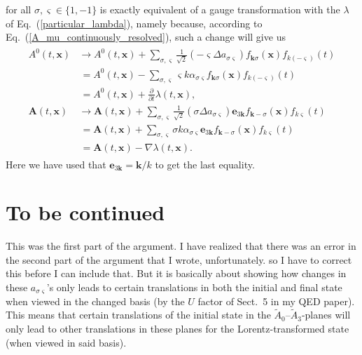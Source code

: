\documentclass{article}
\begin{document}
for all $\sigma, \varsigma \in\{1, -1\}$ is exactly equivalent of a gauge transformation with the $\lambda$ of Eq.\ (\ref{particular_lambda}), 
namely because, according to Eq.\ (\ref{A_mu_continuously_resolved}), such a change will give us
\begin{align}
\begin{aligned}
	A^0(t, \mathbf{x}) &\to
		A^0(t, \mathbf{x}) 
		+ 
		\sum_{\sigma, \varsigma} 
			\frac{1}{\sqrt{2}} (
				-\varsigma \Delta a_{\sigma\varsigma}
			)
			f_{\mathbf{k}\sigma}(\mathbf{x}) f_{k(-\varsigma)}(t)
	\\&\,=
		A^0(t, \mathbf{x}) 
		-
		\sum_{\sigma, \varsigma} 
			\varsigma k \alpha_{\sigma \varsigma}
			f_{\mathbf{k}\sigma}(\mathbf{x}) f_{k(-\varsigma)}(t)
	\\&\,=
		A^0(t, \mathbf{x}) 
		+
		\frac{\partial}{\partial t} \lambda(t, \mathbf{x}),
	\\
	\mathbf{A}(t, \mathbf{x}) &\to
		\mathbf{A}(t, \mathbf{x})
		+ 
		\sum_{\sigma, \varsigma} 
			\frac{1}{\sqrt{2}} (
				\sigma \Delta a_{\sigma\varsigma}
			)
			\mathbf{e}_{3\mathbf{k}}
			f_{\mathbf{k}-\sigma}(\mathbf{x}) f_{k\varsigma}(t)
	\\&\,=
		\mathbf{A}(t, \mathbf{x})
		+
		\sum_{\sigma, \varsigma} 
			\sigma k \alpha_{\sigma \varsigma}
			\mathbf{e}_{3\mathbf{k}}
			f_{\mathbf{k}-\sigma}(\mathbf{x}) f_{k\varsigma}(t)
	\\&\,=
		\mathbf{A}(t, \mathbf{x})
		- 
		\nabla \lambda(t, \mathbf{x}).
\end{aligned}
\end{align}
Here we have used that $\mathbf{e}_{3\mathbf{k}} = \mathbf{k}/k$ to get the last equality. 


\section*{To be continued}
This was the first part of the argument. I have realized that there was an error in the second part of the argument that I wrote, unfortunately. so I have to correct this before I can include that. But it is basically about showing how changes in these $a_{\sigma \varsigma}$'s only leads to certain translations in both the initial and final state when viewed in the changed basis (by the $U$ factor of Sect.\ 5 in my QED paper). This means that certain translations of the initial state in the $\widetilde A_0$--$\widetilde A_3$-planes will only lead to other translations in these planes for the Lorentz-transformed state (when viewed in said basis). 
\end{document}
